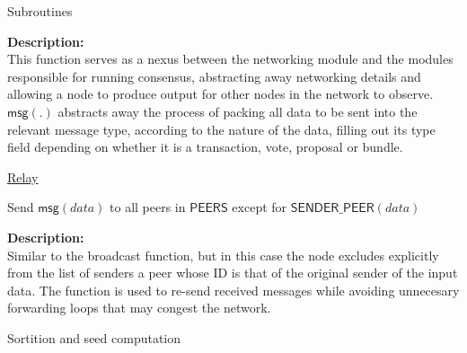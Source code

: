 \documentclass[10pt,a4paper]{article}
\begin{document}
\begin{section}{Subroutines}
\begin{algorithm}[H]
\begin{algorithmic}[1]
    \EndFunction
    \end{algorithmic}
\end{algorithm}

\noindent \textbf{Description:}\\
This function serves as a nexus between the networking module and the modules responsible
for running consensus, abstracting away networking details and allowing a node to produce
output for other nodes in the network to observe.
$\mathsf{msg}(.)$ abstracts away the process of packing all data to be sent into the relevant message type,
according to the nature of the data, filling out its type field depending on whether it is a transaction, 
vote, proposal or bundle.


\begin{algorithm}[H]
    \caption{\underline{Relay}}
    \label{algo:relay}
    \begin{algorithmic}[1]

    Send $\mathsf{msg}(data)$ to all peers in $\mathsf{PEERS}$ except for $\mathsf{SENDER\_PEER}(data)$

    \EndFunction
    \end{algorithmic}
\end{algorithm}

\noindent \textbf{Description:}\\
Similar to the broadcast function, but in this case the node excludes explicitly from the list of senders
a peer whose ID is that of the original sender of the input data.
The function is used to re-send received messages while avoiding unnecesary forwarding loops 
that may congest the network.


\begin{subsection}{Sortition and seed computation}\label{sect:sort-seed}


\end{subsection}
\end{section}
\end{document}
